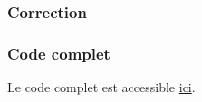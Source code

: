 \documentclass[svgnames,11pt]{beamer}
\begin{document}
\begin{frame}
    \frametitle{Correction}

    

\end{frame}
\begin{frame}
    \frametitle{Code complet}

    Le code complet est accessible \href{https://cviroulaud.github.io/premiere/algorithmique/knn/iris/scripts/iris-correction.zip}{ici}.

\end{frame}
\end{document}
